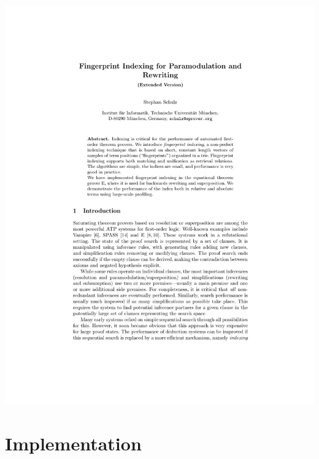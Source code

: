 \documentclass[10pt]{beamer}
\begin{document}
\begin{NoHyper}
\begin{frame}
\begin{center}
  \hspace{1cm}
  \includegraphics[page=14,scale=0.5,trim=6cm 16.2cm 7cm 4cm,clip]{schulz_fp-index_ext}
  \end{center}
\end{frame}

\section{Implementation}


\end{NoHyper}
\end{document}
